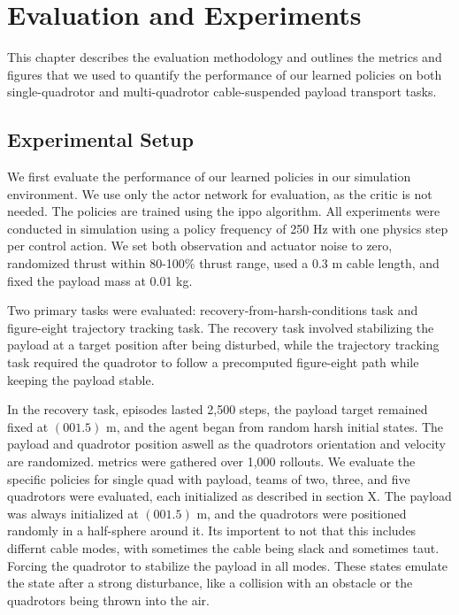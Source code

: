 \chapter{Evaluation and Experiments}

This chapter describes the evaluation methodology and outlines the metrics and figures that we used to quantify the performance of our learned policies on both single-quadrotor and multi-quadrotor cable-suspended payload transport tasks.

\section{Experimental Setup}
We first evaluate the performance of our learned policies in our simulation environment. We use only the actor network for evaluation, as the critic is not needed. The policies are trained using the \gls{ippo} algorithm.
All experiments were conducted in simulation using a policy frequency of 250 Hz with one physics step per control action. We set both observation and actuator noise to zero, randomized thrust within 80-100\% thrust range, used a 0.3 m cable length, and fixed the payload mass at 0.01 kg. 

Two primary tasks were evaluated: 
 recovery-from-harsh-conditions task and figure-eight trajectory tracking task. The recovery task involved stabilizing the payload at a target position after being disturbed, while the trajectory tracking task required the quadrotor to follow a precomputed figure-eight path while keeping the payload stable.

In the recovery task, episodes lasted 2,500 steps, the payload target remained fixed at $(0 0 1.5)$ m, and the agent began from random harsh initial states. The payload and quadrotor position aswell as the quadrotors orientation and velocity are randomized.
 metrics were gathered over 1,000 rollouts. We evaluate the specific policies for single quad with payload, teams of two, three, and five quadrotors were evaluated, each initialized as described in section X. The payload was always initialized at $(0 0 1.5)$ m, and the quadrotors were positioned randomly in a half-sphere around it. Its importent to not that this includes differnt cable modes, with sometimes the cable being slack and sometimes taut. Forcing the quadrotor to stabilize the payload in all modes. These states emulate the state after a strong disturbance, like a collision with an obstacle or the quadrotors being thrown into the air.

